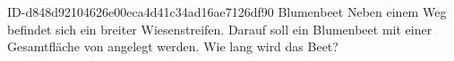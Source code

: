 \begin{exercise}
      {ID-d848d92104626e00eca4d41c34ad16ae7126df90}
      {Blumenbeet}
  \ifproblem\problem
    Neben einem Weg befindet sich ein  breiter Wiesenstreifen. Darauf
    soll ein Blumenbeet mit einer Gesamtfläche von  angelegt werden.
    Wie lang wird das Beet?
  \fi
\end{exercise}
